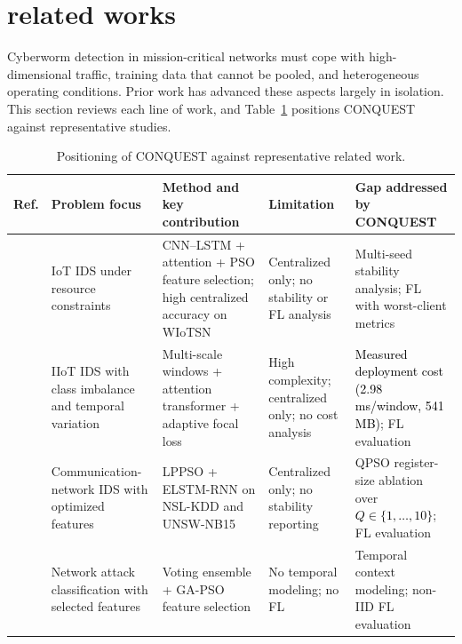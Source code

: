 \documentclass[conference]{IEEEtran}
\begin{document}
\section{\textbf{related works}}
\label{sec:related_works}

Cyberworm detection in mission-critical networks must cope with
high-dimensional traffic, training data that cannot be pooled, and
heterogeneous operating conditions. Prior work has advanced these
aspects largely in isolation. This section reviews each line of work,
and Table~\ref{tab:rw_qualitative} positions CONQUEST against
representative studies.

\begin{table}[!htbp]
\centering
\scriptsize
\caption{Positioning of CONQUEST against representative related work.}
\label{tab:rw_qualitative}
\setlength{\tabcolsep}{5pt}
\renewcommand{\arraystretch}{1.3}
\begin{tabular}{>{\raggedright\arraybackslash}p{1.0cm} >{\raggedright\arraybackslash}p{2.6cm} >{\raggedright\arraybackslash}p{4.0cm} >{\raggedright\arraybackslash}p{3.2cm} >{\raggedright\arraybackslash}p{4.4cm}}
\hline\toprule
\textbf{Ref.} & \textbf{Problem focus} & \textbf{Method and key contribution} & \textbf{Limitation} & \textbf{Gap addressed by CONQUEST} \\
\hline\toprule
\cite{phalaagaehybrid} & IoT IDS under resource constraints & CNN--LSTM + attention + PSO feature selection; high centralized accuracy on WIoTSN & Centralized only; no stability or FL analysis & Multi-seed stability analysis; FL with worst-client metrics \\

\midrule

\cite{yuadaptive} & IIoT IDS with class imbalance and temporal variation & Multi-scale windows + attention transformer + adaptive focal loss & High complexity; centralized only; no cost analysis & \textcolor{black}{Measured deployment cost (2.98\,ms/window, 541\,MB)}; FL evaluation \\

\midrule

\cite{donkoloptimization} & Communication-network IDS with optimized features & LPPSO + ELSTM-RNN on NSL-KDD and UNSW-NB15 & Centralized only; no stability reporting & QPSO register-size ablation over \textcolor{black}{$Q\in\{1,\dots,10\}$}; FL evaluation \\

\midrule

\cite{shrivashybrid} & Network attack classification with selected features & Voting ensemble + GA-PSO feature selection & No temporal modeling; no FL & Temporal context modeling; non-IID FL evaluation \\


\end{tabular}
\end{table}
\end{document}
